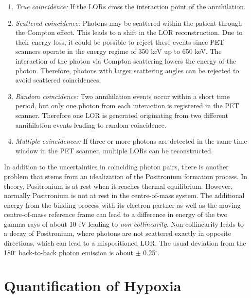 \begin{enumerate}
\item \textit{True coincidence: }If the LORs cross the interaction point of the annihilation.
\item \textit{Scattered coincidence: }Photons may be scattered within the patient through the Compton effect. This leads to a shift in the LOR reconstruction. Due to their energy loss, it could be possible to reject these events since PET scanners operate in the energy regime of 350 keV up to 650 keV. The interaction of the photon via Compton scattering lowers the energy of the photon. Therefore, photons with larger scattering angles can be rejected to avoid scattered coincidences.\
\item \textit{Random coincidence: }Two annihilation events occur within a short time period, but only one photon from each interaction is registered in the PET scanner. Therefore one LOR is generated originating from two different annihilation events leading to random coincidence. 
\item \textit{Multiple coincidences: }If three or more photons are detected in the same time window in the PET scanner, multiple LORs can be reconstructed.
\end{enumerate}
In addition to the uncertainties in coinciding photon pairs, there is another problem that stems from an idealization of the Positronium formation process. In theory, Positronium is at rest when it reaches thermal equilibrium. However, normally Positronium is not at rest in the centre-of-mass system. The additional energy from the binding process with its electron partner as well as the moving centre-of-mass reference frame can lead to a difference in energy of the two gamma rays of about 10 eV leading to \textit{non-collinearity}. Non-collinearity leads to a decay of Positronium, where photons are not scattered exactly in opposite directions, which can lead to a mispositioned LOR. The usual deviation from the 180$^\circ$ back-to-back photon emission is about $\pm$ 0.25$^\circ$\cite{Cherry}.

\section{Quantification of Hypoxia}
